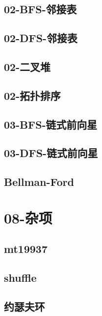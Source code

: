 \documentclass[10pt,a4paper]{article}
\begin{document}
\subsection{02-BFS-邻接表}

\subsection{02-DFS-邻接表}

\subsection{02-二叉堆}

\subsection{02-拓扑排序}

\subsection{03-BFS-链式前向星}

\subsection{03-DFS-链式前向星}

\subsection{Bellman-Ford}

\section{08-杂项}
\subsection{mt19937}

\subsection{shuffle}

\subsection{约瑟夫环}

\end{document}

